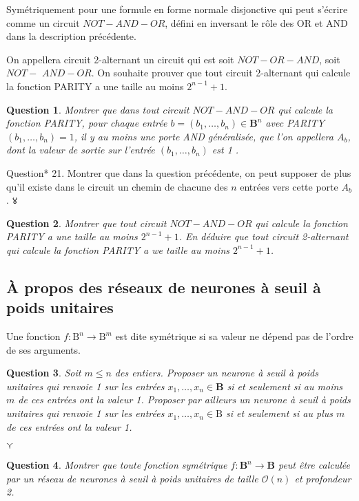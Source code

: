 \documentclass[10pt]{article}
\newtheorem{question}{Question}
\begin{document}
Symétriquement pour une formule en forme normale disjonctive qui peut s'écrire comme un circuit $N O T-A N D-O R$, défini en inversant le rôle des OR et AND dans la description précédente.

On appellera circuit 2-alternant un circuit qui est soit $N O T-O R-A N D$, soit $N O T-$ $A N D-O R$. On souhaite prouver que tout circuit 2-alternant qui calcule la fonction PARITY a une taille au moins $2^{n-1}+1$.

\begin{question}
	Montrer que dans tout circuit $N O T-A N D-O R$ qui calcule la fonction PARITY, pour chaque entrée $b=\left(b_{1}, \ldots, b_{n}\right) \in \mathbf{B}^{n}$ avec PARITY $\left(b_{1}, \ldots, b_{n}\right)=1$, il y au moins une porte AND généralisée, que l'on appellera $A_{b}$, dont la valeur de sortie sur l'entrée $\left(b_{1}, \ldots, b_{n}\right)$ est 1 .
\end{question}

Question* 21. Montrer que dans la question précédente, on peut supposer de plus qu'il existe dans le circuit un chemin de chacune des $n$ entrées vers cette porte $A_{b}$. ४ \begin{question}
	Montrer que tout circuit $N O T-A N D-O R$ qui calcule la fonction PARITY a une taille au moins $2^{n-1}+1$. En déduire que tout circuit 2-alternant qui calcule la fonction PARITY a we taille au moins $2^{n-1}+1$.
\end{question}

\subsection{À propos des réseaux de neurones à seuil à poids unitaires}
Une fonction $f: \mathrm{B}^{n} → \mathrm{B}^{m}$ est dite symétrique si sa valeur ne dépend pas de l'ordre de ses arguments.

\begin{question}
	Soit $m ≤ n$ des entiers. Proposer un neurone à seuil à poids unitaires qui renvoie 1 sur les entrées $x_{1}, \ldots, x_{n} \in \mathbf{B}$ si et seulement si au moins $m$ de ces entrées ont la valeur 1. Proposer par ailleurs un neurone à seuil à poids unitaires qui renvoie 1 sur les entrées $x_{1}, \ldots, x_{n} \in \mathrm{B}$ si et seulement si au plus $m$ de ces entrées ont la valeur 1.
\end{question}

$\curlyvee$ \begin{question}
	Montrer que toute fonction symétrique $f: \mathbf{B}^{n} → \mathbf{B}$ peut être calculée par un réseau de neurones à seuil à poids unitaires de taille $\mathcal{O}(n)$ et profondeur 2.
\end{question}
\end{document}
